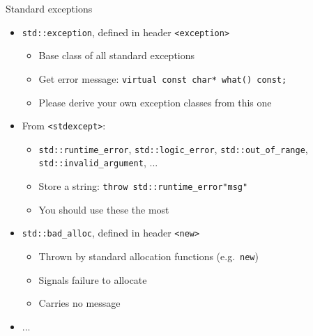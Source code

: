 \begin{frame}[fragile]
  \begin{block}{Standard exceptions}
    \begin{itemize}
      \item \texttt{std::exception}, defined in header \texttt{<exception>}
      \begin{itemize}
        \item Base class of all standard exceptions
        \item Get error message: \texttt{virtual const char* what() const;}
        \item Please derive your own exception classes from this one
      \end{itemize}
      \item From \texttt{<stdexcept>}:
      \begin{itemize}
        \item \texttt{std::runtime_error}, \texttt{std::logic_error}, \texttt{std::out_of_range}, \texttt{std::invalid_argument}, ...
        \item Store a string: \texttt{throw std::runtime_error{"msg"}}
        \item You should use these the most
      \end{itemize}
      \item \texttt{std::bad_alloc}, defined in header \texttt{<new>}
      \begin{itemize}
        \item Thrown by standard allocation functions (e.g.\ \texttt{new})
        \item Signals failure to allocate
        \item Carries no message
      \end{itemize}
      \item ...
    \end{itemize}
  \end{block}
\end{frame}

